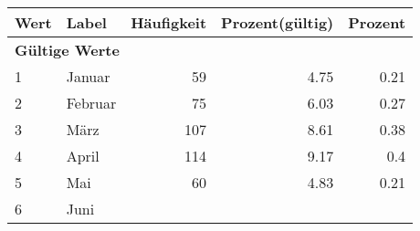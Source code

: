      \begin{longtable}{lXrrr}
     \toprule
     \textbf{Wert} & \textbf{Label} & \textbf{Häufigkeit} & \textbf{Prozent(gültig)} & \textbf{Prozent} \\
     \endhead
     \midrule
     \multicolumn{5}{l}{\textbf{Gültige Werte}}\\

     1 &
     \multicolumn{1}{X}{ Januar   } &


       \num{59} &
       \num[round-mode=places,round-precision=2]{4,75} &
         \num[round-mode=places,round-precision=2]{0,21} \\

     2 &
     \multicolumn{1}{X}{ Februar   } &


       \num{75} &
       \num[round-mode=places,round-precision=2]{6,03} &
         \num[round-mode=places,round-precision=2]{0,27} \\

     3 &
     \multicolumn{1}{X}{ März   } &


       \num{107} &
       \num[round-mode=places,round-precision=2]{8,61} &
         \num[round-mode=places,round-precision=2]{0,38} \\

     4 &
     \multicolumn{1}{X}{ April   } &


       \num{114} &
       \num[round-mode=places,round-precision=2]{9,17} &
         \num[round-mode=places,round-precision=2]{0,4} \\

     5 &
     \multicolumn{1}{X}{ Mai   } &


       \num{60} &
       \num[round-mode=places,round-precision=2]{4,83} &
         \num[round-mode=places,round-precision=2]{0,21} \\

     6 &
     \multicolumn{1}{X}{ Juni   } &



\end{longtable}
